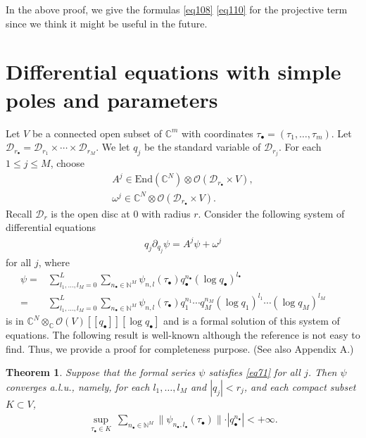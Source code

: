 \documentclass[11pt,b5paper,notitlepage]{article}
\theoremstyle{definition}
\theoremstyle{plain}
\newtheorem{thm}[df]{Theorem}
\newcommand{\mc}{\mathcal}
\newcommand{\End}{\mathrm{End}} %
\newcommand{\scr}{\mathscr}
\newcommand{\blt}{\bullet}
\newcommand{\Cbb}{\mathbb C}
\newcommand{\Nbb}{\mathbb N}
\numberwithin{equation}{section}
\begin{document}
In the above proof, we give the formulas \eqref{eq108} \eqref{eq110} for the projective term since we think it might be useful in the future.








\appendix





\section{Differential equations with simple poles and parameters}





Let $V$ be a connected  open subset of $\Cbb^m$ with coordinates $\tau_\blt=(\tau_1,\dots,\tau_m)$. Let $\mc D_{r_\blt}=\mc D_{r_1}\times\cdots\times\mc D_{r_M}$.  We let $q_j$ be the standard variable of $\mc D_{r_j}$.  For each $1\leq j\leq M$, choose
\begin{gather*}
A^j\in\End(\Cbb^N)\otimes\scr O(\mc D_{r_\blt}\times V),\\
\omega^j\in\Cbb^N\otimes\scr O(\mc D_{r_\blt}\times V).
\end{gather*}
Recall $\mc D_r$ is the open disc at $0$ with radius $r$. Consider the following  system of differential equations
\begin{align}
q_j\partial_{q_j}\psi=A^j\psi+\omega^j\label{eq71}
\end{align}
for all $j$, where
\begin{align}
\psi=&\sum_{l_1,\dots,l_M=0}^L\sum_{n_\blt\in \Nbb^M}\psi_{n,l}(\tau_\blt)q_\blt^{n_\blt}(\log q_\blt)^{l_\blt}\nonumber\\
=&\sum_{l_1,\dots,l_M=0}^L\sum_{n_\blt\in \Nbb^M}\psi_{n,l}(\tau_\blt)q_1^{n_1}\cdots q_M^{n_M}(\log q_1)^{l_1}\cdots (\log q_M)^{l_M}\qquad\label{eq77}
\end{align}
is in $\Cbb^N\otimes_\Cbb\scr O(V)[[q_\blt]][\log q_\blt]$ and is a formal solution of this system of equations. The following result is well-known although the reference is not easy to find. Thus, we provide a proof for completeness purpose. (See also \cite{McR21} Appendix A.)

\begin{thm}\label{lb39}
Suppose that the formal series $\psi$ satisfies \eqref{eq71} for all $j$. Then $\psi$ converges a.l.u., namely, for each $l_1,\dots,l_M$ and $|q_j|<r_j$, and each compact subset $K\subset V$,
\begin{align}
\sup_{\tau_\blt\in K}~\sum_{n_\blt\in\Nbb^M}\lVert \psi_{n_\blt,l_\blt}(\tau_\blt) \lVert \cdot |q_\blt^{n_\blt}|<+\infty	\label{eq103}.
\end{align}
\end{thm}
\end{document}
